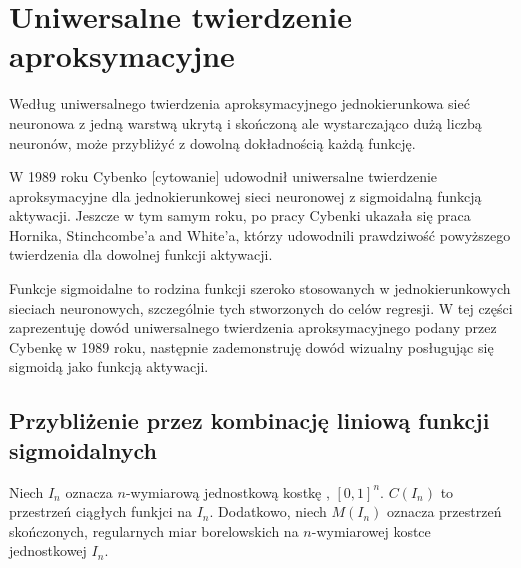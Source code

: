 \documentclass[]{article}
\theoremstyle{definition}
\begin{document}
\begin{center}
	
\end{center}


\newpage
\section{Uniwersalne twierdzenie aproksymacyjne}

Według uniwersalnego twierdzenia aproksymacyjnego jednokierunkowa sieć neuronowa z jedną warstwą ukrytą i skończoną ale wystarczająco dużą liczbą neuronów, może przybliżyć z dowolną dokładnością każdą funkcję.

W 1989 roku Cybenko [cytowanie] udowodnił uniwersalne twierdzenie aproksymacyjne dla jednokierunkowej sieci neuronowej z sigmoidalną funkcją aktywacji. Jeszcze w tym samym roku, po pracy Cybenki ukazała się praca Hornika, Stinchcombe'a and White'a, którzy udowodnili prawdziwość powyższego twierdzenia dla dowolnej funkcji aktywacji.

Funkcje sigmoidalne to rodzina funkcji szeroko stosowanych w jednokierunkowych sieciach neuronowych, szczególnie tych stworzonych do celów regresji. W tej części zaprezentuję dowód uniwersalnego twierdzenia aproksymacyjnego podany przez Cybenkę w 1989 roku, następnie zademonstruję dowód wizualny posługując się sigmoidą jako funkcją aktywacji.



\subsection{Przybliżenie przez kombinację liniową funkcji sigmoidalnych}

Niech $I_n$ oznacza $n$-wymiarową jednostkową kostkę , $[0,1]^n$. $C(I_n)$ to przestrzeń ciągłych funkjci na $I_n$. Dodatkowo, niech $M(I_n)$ oznacza przestrzeń skończonych, regularnych miar borelowskich na $n$-wymiarowej kostce jednostkowej $I_n$.
\end{document}
